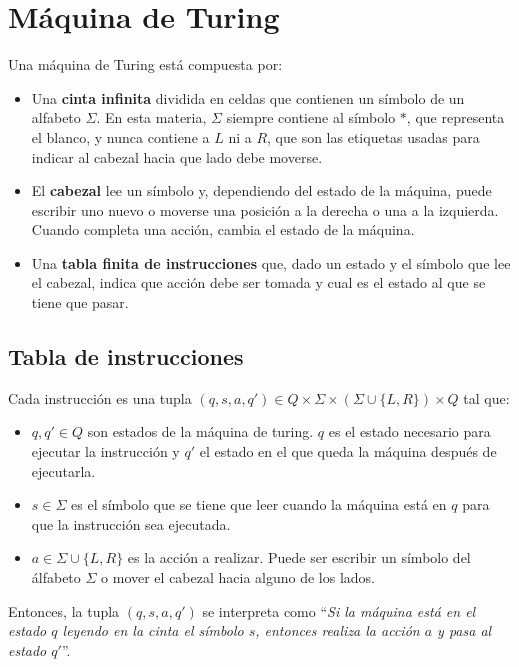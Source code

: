 	\section{Máquina de Turing}
	Una máquina de Turing está compuesta por:

	\begin{itemize}
		\item Una \textbf{cinta infinita}  dividida en celdas que contienen un símbolo de un alfabeto $\Sigma$. En esta materia, $\Sigma$ siempre contiene al símbolo $*$, que representa el blanco, y nunca contiene a $L$ ni a $R$, que son las etiquetas usadas para indicar al cabezal hacia que lado debe moverse.
		\item El \textbf{cabezal} lee un símbolo y, dependiendo del estado de la máquina, puede escribir uno nuevo o moverse una posición a la derecha o una a la izquierda. Cuando completa una acción, cambia el estado de la máquina.
		\item Una \textbf{tabla finita de instrucciones} que, dado un estado y el símbolo que lee el cabezal, indica que acción debe ser tomada y cual es el estado al que se tiene que pasar.
	\end{itemize}

	\subsection{Tabla de instrucciones}
	Cada instrucción es una tupla $(q,s,a,q')\in Q\times\Sigma\times (\Sigma\cup \{L,R\}) \times Q$ tal que:
	\begin{itemize}
		\item $q,q'\in Q$ son estados de la máquina de turing. $q$ es el estado necesario para ejecutar la instrucción y $q'$ el estado en el que queda la máquina después de ejecutarla.
		\item $s\in\Sigma$ es el símbolo que se tiene que leer cuando la máquina está en $q$ para que la instrucción sea ejecutada.
		\item $a\in\Sigma\cup \{L,R\}$ es la acción a realizar. Puede ser escribir un símbolo del álfabeto $\Sigma$ o mover el cabezal hacia alguno de los lados.
	\end{itemize}

	Entonces, la tupla $(q,s,a,q')$ se interpreta como ``\textit{Si la máquina está en el estado $q$ leyendo en la cinta el símbolo $s$, entonces realiza la acción $a$ y pasa al estado $q'$}''.
		
